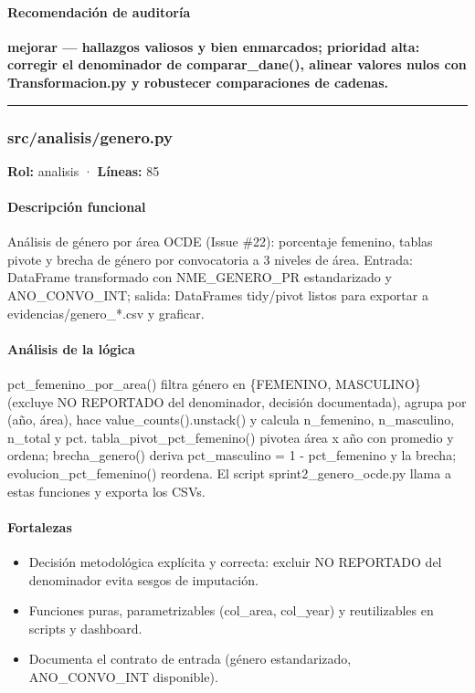 \paragraph{Recomendación de auditoría}
\textbf{mejorar --- hallazgos valiosos y bien enmarcados; prioridad alta: corregir el denominador de comparar\_dane(), alinear valores nulos con Transformacion.py y robustecer comparaciones de cadenas.}

\medskip
\hrule

\subsubsection{src/analisis/genero.py}
\textbf{Rol:} analisis · \textbf{Líneas:} 85

\paragraph{Descripción funcional}
Análisis de género por área OCDE (Issue \#22): porcentaje femenino, tablas pivote y brecha de género por convocatoria a 3 niveles de área. Entrada: DataFrame transformado con NME\_GENERO\_PR estandarizado y ANO\_CONVO\_INT; salida: DataFrames tidy/pivot listos para exportar a evidencias/genero\_*.csv y graficar.

\paragraph{Análisis de la lógica}
pct\_femenino\_por\_area() filtra género en \{FEMENINO, MASCULINO\} (excluye NO REPORTADO del denominador, decisión documentada), agrupa por (año, área), hace value\_counts().unstack() y calcula n\_femenino, n\_masculino, n\_total y pct. tabla\_pivot\_pct\_femenino() pivotea área x año con promedio y ordena; brecha\_genero() deriva pct\_masculino = 1 - pct\_femenino y la brecha; evolucion\_pct\_femenino() reordena. El script sprint2\_genero\_ocde.py llama a estas funciones y exporta los CSVs.

\paragraph{Fortalezas}
\begin{itemize}
  \item Decisión metodológica explícita y correcta: excluir NO REPORTADO del denominador evita sesgos de imputación.
  \item Funciones puras, parametrizables (col\_area, col\_year) y reutilizables en scripts y dashboard.
  \item Documenta el contrato de entrada (género estandarizado, ANO\_CONVO\_INT disponible).
\end{itemize}

